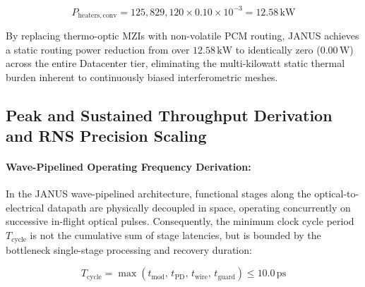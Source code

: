 \documentclass[journal]{IEEEtran}
\begin{document}
\begin{equation}
P_{\mathrm{heaters,conv}} = 125,829,120 \times 0.10 \times 10^{-3} = 12.58\,\mathrm{kW}
\end{equation}

By replacing thermo-optic MZIs with non-volatile PCM routing, JANUS achieves a static routing power reduction from over $12.58\,\mathrm{kW}$ to identically zero ($0.00\,\mathrm{W}$) across the entire Datacenter tier, eliminating the multi-kilowatt static thermal burden inherent to continuously biased interferometric meshes.

\subsection{\textbf{Peak and Sustained Throughput Derivation and RNS Precision Scaling}}
\label{sec:operating_frequency}

\paragraph{\textbf{Wave-Pipelined Operating Frequency Derivation:}}

In the JANUS wave-pipelined architecture, functional stages along the optical-to-electrical datapath are physically decoupled in space, operating concurrently on successive in-flight optical pulses. Consequently, the minimum clock cycle period $T_{\text{cycle}}$ is not the cumulative sum of stage latencies, but is bounded by the bottleneck single-stage processing and recovery duration:

\begin{equation}
T_{\text{cycle}} = \max\left( t_{\text{mod}}, \, t_{\text{PD}}, \, t_{\text{wire}}, \, t_{\text{guard}} \right) \le 10.0\,\text{ps}
\end{equation}
\end{document}
